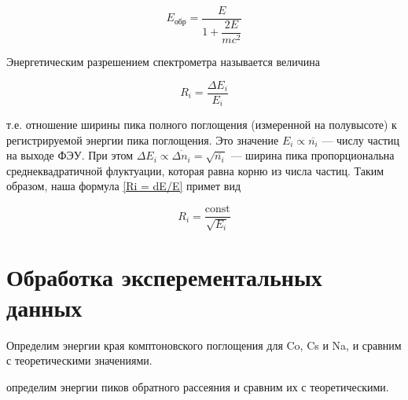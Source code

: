 	\begin{equation}\label{Eobr}
		E_{обр} = \dfrac{E}{1 + \dfrac{2E}{mc^2}}
	\end{equation}

%	
	Энергетическим разрешением спектрометра называется величина
	
	\begin{equation}\label{Ri = dE/E}
	R_i = \dfrac{\Delta E_i}{E_i}
	\end{equation}
	
	т.е. отношение ширины пика полного поглощения (измеренной на полувысоте) к регистрируемой энергии пика поглощения. Это значение $ E_i \propto \overline{n_i} $ --- числу частиц на выходе ФЭУ. При этом  $ \Delta E_i \propto \overline{\Delta n_i} = \sqrt{\overline{n_i}} $ --- ширина пика пропорциональна среднеквадратичной флуктуации, которая равна корню из числа частиц. Таким образом, наша формула \eqref{Ri = dE/E} примет вид
	
	\begin{equation}\label{Ri = c/E}
	R_i = \dfrac{\mathrm{const}}{\sqrt{E_i}}
	\end{equation}

    \section*{Обработка эксперементальных данных}



    Определим энергии края комптоновского поглощения для Co, Cs и Na, и сравним с теоретическими значениями.

    

    определим энергии пиков обратного рассеяния и сравним их с теоретическими.

    


